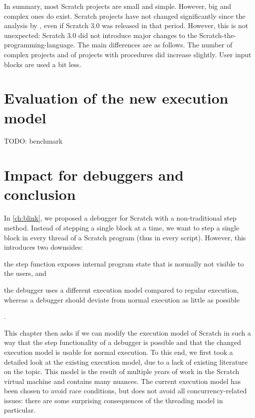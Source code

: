 \documentclass[../main]{subfiles}
\begin{document}
In summary, most Scratch projects are small and simple.
However, big and complex ones do exist.
Scratch projects have not changed significantly since the analysis by \textcite{aivaloglouHowKidsCode2016}, even if Scratch 3.0 was released in that period.
However, this is not unexpected: Scratch 3.0 did not introduce major changes to the Scratch-the-programming-language.
The main differences are as follows.
The number of complex projects and of projects with procedures did increase slightly.
User input blocks are used a bit less.

\section{Evaluation of the new execution model}\label{sec:evaluation-of-the-new-execution-model}

TODO: benchmark

\section{Impact for debuggers and conclusion}\label{sec:conclusion}

In \cref{ch:blink}, we proposed a debugger for Scratch with a non-traditional step method.
Instead of stepping a single block at a time, we want to step a single block in every thread of a Scratch program (thus in every script).
However, this introduces two downsides:
\begin{enumerate*}[label=\emph{\roman*})]
    \item the step function exposes internal program state that is normally not visible to the users, and
    \item the debugger uses a different execution model compared to regular execution, whereas a debugger should deviate from normal execution as little as possible
\end{enumerate*}.

This chapter then asks if we can modify the execution model of Scratch in such a way that the step functionality of a debugger is possible and that the changed execution model is usable for normal execution.
To this end, we first took a detailed look at the existing execution model, due to a lack of existing literature on the topic.
This model is the result of multiple years of work in the Scratch virtual machine and contains many nuances.
The current execution model has been chosen to avoid race conditions, but does not avoid all concurrency-related issues: there are some surprising consequences of the threading model in particular.
\end{document}
